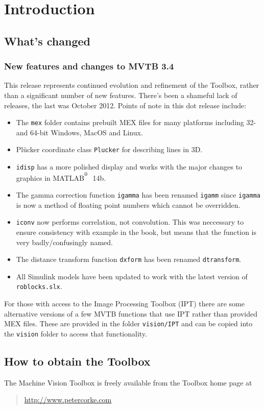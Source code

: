 \documentclass[a4paper]{report}
\def\Mlab{MATLAB$^{\textsuperscript{\textregistered}}$}
\begin{document}
\chapter{Introduction}
\section{What's changed}

\subsection{New features and changes to MVTB 3.4}

This release represents continued evolution and refinement of the Toolbox, rather than a significant number of new features.  There's been a
shameful lack of releases, the last was October 2012.  Points of note in this dot release include:
\begin{itemize}
\item The \texttt{mex} folder contains prebuilt MEX files for many platforms including 32- and 64-bit Windows, MacOS and Linux.
\item Pl\"{u}cker coordinate class \texttt{Plucker} for describing lines in 3D.
\item \texttt{idisp} has a more polished display and works with the major changes to graphics in \Mlab\ 14b.
\item The gamma correction function \texttt{igamma} has been renamed \texttt{igamm} since \texttt{igamma} is now a method of floating point numbers
which cannot be overridden.
\item \texttt{iconv} now performs correlation, not convolution.  This was neccessary to ensure consistency with example in the book, but means
that the function is very badly/confusingly named.
\item The distance transform function \texttt{dxform} has been renamed \texttt{dtransform}.
\item All Simulink models have been updated to work with the latest version of \texttt{roblocks.slx}.
\end{itemize}

For those with access to the Image Processing Toolbox (IPT) there are some alternative versions of a few MVTB functions that use IPT rather
than provided MEX files.  These are provided in the folder \texttt{vision/IPT} and can be copied into the \texttt{vision} folder to access that functionality.

\section{How to obtain the Toolbox}
The Machine Vision Toolbox is freely available from the Toolbox home
page at 
\begin{quote}
\url{http://www.petercorke.com}
\end{quote}
\end{document}
